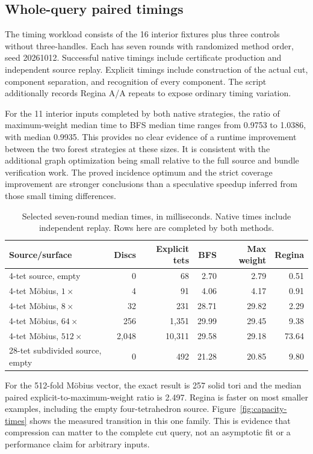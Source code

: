 \subsection{Whole-query paired timings}

The timing workload consists of the 16 interior fixtures plus three
controls without three-handles. Each has seven rounds with randomized
method order, seed 20261012. Successful native timings include certificate
production and independent source replay. Explicit timings include
construction of the actual cut, component separation, and recognition of
every component. The script additionally records Regina A/A repeats to
expose ordinary timing variation.

For the 11 interior inputs completed by both native strategies, the ratio
of maximum-weight median time to BFS median time ranges from 0.9753 to
1.0386, with median 0.9935. This provides no clear evidence of a runtime
improvement between the two forest strategies at these sizes. It is
consistent with the additional graph optimization being small relative to
the full source and bundle verification work. The proved incidence optimum
and the strict coverage improvement are stronger conclusions than a
speculative speedup inferred from those small timing differences.

\begin{table}[htbp]
\centering\small
\caption{Selected seven-round median times, in milliseconds. Native times
include independent replay. Rows here are completed by both methods.}
\label{tab:paired-times}
\begin{tabular}{lrrrrr}
\toprule
Source/surface & Discs & Explicit tets & BFS & Max weight & Regina\\
\midrule
4-tet source, empty & 0 & 68 & 2.70 & 2.79 & 0.51\\
4-tet M\"obius, $1\times$ & 4 & 91 & 4.06 & 4.17 & 0.91\\
4-tet M\"obius, $8\times$ & 32 & 231 & 28.71 & 29.82 & 2.29\\
4-tet M\"obius, $64\times$ & 256 & 1,351 & 29.99 & 29.45 & 9.38\\
4-tet M\"obius, $512\times$ & 2,048 & 10,311 & 29.58 & 29.18 & 73.64\\
28-tet subdivided source, empty & 0 & 492 & 21.28 & 20.85 & 9.80\\
\bottomrule
\end{tabular}
\end{table}

For the 512-fold M\"obius vector, the exact result is 257 solid tori and
the median paired explicit-to-maximum-weight ratio is 2.497. Regina is
faster on most smaller examples, including the empty four-tetrahedron
source. Figure~\ref{fig:capacity-times} shows the measured transition in
this one family. This is evidence that compression can matter to the
complete cut query, not an asymptotic fit or a performance claim for
arbitrary inputs.

